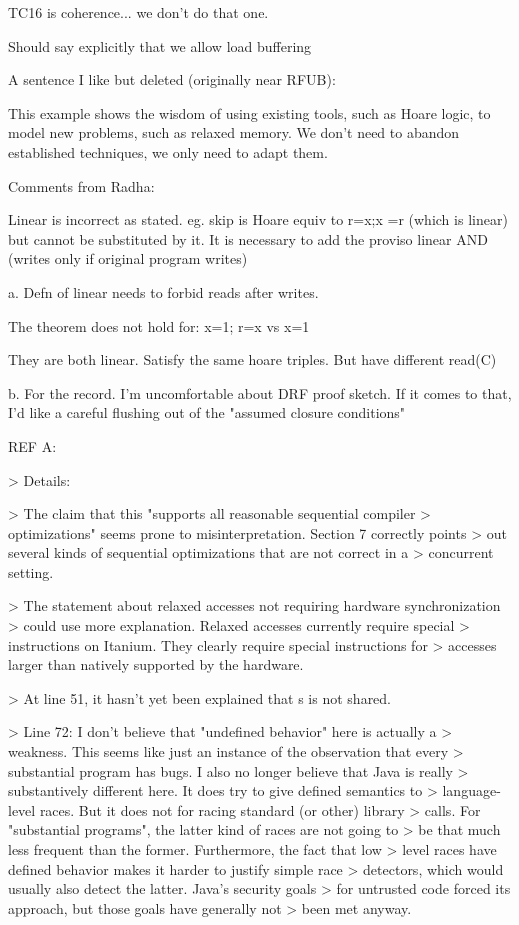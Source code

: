 \documentclass[acmsmall,review,anonymous,screen]{acmart}\settopmatter{printfolios=true}
\theoremstyle{acmdefinition}
\begin{document}
TC16 is coherence... we don't do that one.


Should say explicitly that we allow load buffering


A sentence I like but deleted (originally near RFUB):

This example shows the wisdom of using existing tools, such as Hoare logic,
to model new problems, such as relaxed memory.  We don't need to abandon
established techniques, we only need to adapt them.

Comments from Radha:

Linear is incorrect as stated. eg. skip is Hoare equiv to r=x;x =r (which is
linear) but cannot be substituted by it.  It is necessary to add the proviso
linear AND (writes only if original program writes)


a. Defn of linear needs to forbid reads after writes. 

The theorem does not hold for:
   x=1; r=x
vs
   x=1

They are both linear. Satisfy the same hoare triples.  But have different
read(C)


b. For the record.  I'm uncomfortable about DRF proof sketch.  If it comes to
that, I'd like a careful flushing out of the "assumed closure conditions"

REF A:

> Details:

> The claim that this "supports all reasonable sequential compiler
> optimizations" seems prone to misinterpretation. Section 7 correctly points
> out several kinds of sequential optimizations that are not correct in a
> concurrent setting. 

> The statement about relaxed accesses not requiring hardware synchronization
> could use more explanation. Relaxed accesses currently require special
> instructions on Itanium. They clearly require special instructions for
> accesses larger than natively supported by the hardware. 

> At line 51, it hasn't yet been explained that s is not shared.

> Line 72: I don't believe that "undefined behavior" here is actually a
> weakness. This seems like just an instance of the observation that every
> substantial program has bugs. I also no longer believe that Java is really
> substantively different here. It does try to give defined semantics to
> language-level races. But it does not for racing standard (or other) library
> calls. For "substantial programs", the latter kind of races are not going to
> be that much less frequent than the former. Furthermore, the fact that low
> level races have defined behavior makes it harder to justify simple race
> detectors, which would usually also detect the latter. Java's security goals
> for untrusted code forced its approach, but those goals have generally not
> been met anyway. 
\end{document}
